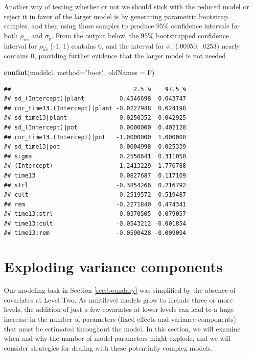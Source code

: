 \documentclass[
]{krantz}
\newenvironment{Shaded}{\begin{snugshade}}{\end{snugshade}}
\newcommand{\DataTypeTok}[1]{\textcolor[rgb]{0.27,0.27,0.27}{#1}}
\newcommand{\KeywordTok}[1]{\textcolor[rgb]{0.27,0.27,0.27}{\textbf{#1}}}
\newcommand{\NormalTok}[1]{#1}
\newcommand{\StringTok}[1]{\textcolor[rgb]{0.5,0.5,0.5}{#1}}
\begin{document}
Another way of testing whether or not we should stick with the reduced model or reject it in favor of the larger model is by generating parametric bootstrap samples, and then using those samples to produce 95\% confidence intervals for both \(\rho_{\tilde{u}\tilde{v}}\) and \(\sigma_{\tilde{v}}\). From the output below, the 95\% bootstrapped confidence interval for \(\rho_{\tilde{u}\tilde{v}}\) (-1, 1) contains 0, and the interval for \(\sigma_{\tilde{v}}\) (.00050, .0253) nearly contains 0, providing further evidence that the larger model is not needed.

\begin{Shaded}
\begin{Highlighting}[]
\KeywordTok{confint}\NormalTok{(modelcl, }\DataTypeTok{method=}\StringTok{"boot"}\NormalTok{, }\DataTypeTok{oldNames =}\NormalTok{ F)}
\end{Highlighting}
\end{Shaded}

\begin{verbatim}
##                                   2.5 %    97.5 %
## sd_(Intercept)|plant          0.4546698  0.643747
## cor_time13.(Intercept)|plant -0.0227948  0.624198
## sd_time13|plant               0.0250352  0.042925
## sd_(Intercept)|pot            0.0000000  0.402128
## cor_time13.(Intercept)|pot   -1.0000000  1.000000
## sd_time13|pot                 0.0004998  0.025339
## sigma                         0.2550641  0.311050
## (Intercept)                   1.2413229  1.776788
## time13                        0.0827687  0.117109
## strl                         -0.3854266  0.216792
## cult                         -0.2519572  0.519487
## rem                          -0.2271840  0.474341
## time13:strl                   0.0370505  0.079057
## time13:cult                  -0.0543212 -0.001854
## time13:rem                   -0.0590428 -0.009094
\end{verbatim}

\hypertarget{sec:explodingvarcomps}{%
\section{Exploding variance components}\label{sec:explodingvarcomps}}

Our modeling task in Section \ref{sec:boundary} was simplified by the absence of covariates at Level Two. As multilevel models grow to include three or more levels, the addition of just a few covariates at lower levels can lead to a huge increase in the number of parameters (fixed effects and variance components)  that must be estimated throughout the model. In this section, we will examine when and why the number of model parameters might explode, and we will consider strategies for dealing with these potentially complex models.
\end{document}
